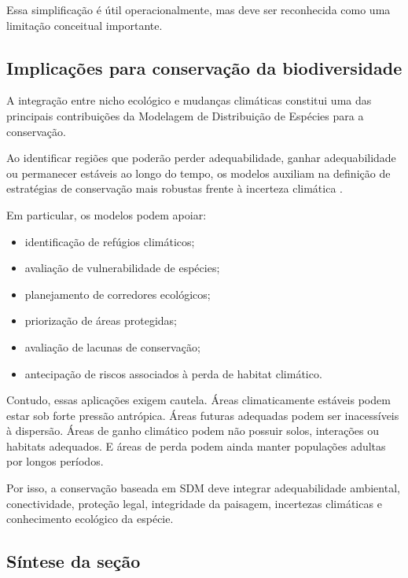 Essa simplificação é útil operacionalmente, mas deve ser reconhecida como uma limitação conceitual importante.

\subsection{Implicações para conservação da biodiversidade}

A integração entre nicho ecológico e mudanças climáticas constitui uma das principais contribuições da Modelagem de Distribuição de Espécies para a conservação.

Ao identificar regiões que poderão perder adequabilidade, ganhar adequabilidade ou permanecer estáveis ao longo do tempo, os modelos auxiliam na definição de estratégias de conservação mais robustas frente à incerteza climática \parencite{araújo2006,thuiller2005}.

Em particular, os modelos podem apoiar:

\begin{itemize}
	
	\item identificação de refúgios climáticos;
	
	\item avaliação de vulnerabilidade de espécies;
	
	\item planejamento de corredores ecológicos;
	
	\item priorização de áreas protegidas;
	
	\item avaliação de lacunas de conservação;
	
	\item antecipação de riscos associados à perda de habitat climático.
	
\end{itemize}

Contudo, essas aplicações exigem cautela. Áreas climaticamente estáveis podem estar sob forte pressão antrópica. Áreas futuras adequadas podem ser inacessíveis à dispersão. Áreas de ganho climático podem não possuir solos, interações ou habitats adequados. E áreas de perda podem ainda manter populações adultas por longos períodos.

Por isso, a conservação baseada em SDM deve integrar adequabilidade ambiental, conectividade, proteção legal, integridade da paisagem, incertezas climáticas e conhecimento ecológico da espécie.

\subsection{Síntese da seção}

